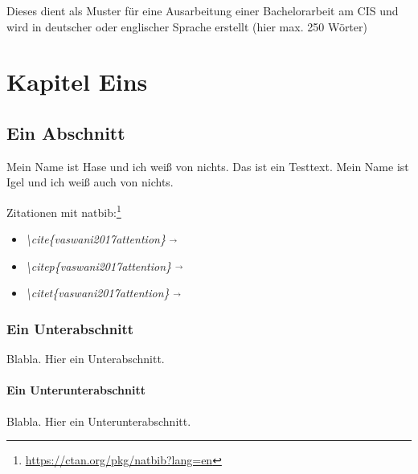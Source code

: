 \documentclass[11pt,a4paper,twoside,openright]{scrbook}
\begin{document}
\deckblatt

\pagestyle{scrheadings}

\erklaerung

\thispagestyle{scrplain}
\noindent
Dieses 
dient als Muster für eine Ausarbeitung einer
Bachelorarbeit am CIS und wird in deutscher oder englischer Sprache
erstellt (hier max. 250 Wörter)


\tableofcontents


\chapter{Kapitel Eins}

\section{Ein Abschnitt}
Mein Name ist Hase und ich weiß von nichts. Das ist ein Testtext. Mein Name ist
Igel und ich weiß auch von nichts. 

\vspace{1em}
\noindent Zitationen mit natbib:\footnote{\url{https://ctan.org/pkg/natbib?lang=en}} 

\begin{itemize}
    \item \textit{\textbackslash cite\{vaswani2017attention\}} $\overrightarrow{}$ \cite{vaswani2017attention}
    \item \textit{\textbackslash citep\{vaswani2017attention\}} $\overrightarrow{}$ \citep{vaswani2017attention}
    \item \textit{\textbackslash citet\{vaswani2017attention\}} $\overrightarrow{}$ \citet{vaswani2017attention}
\end{itemize}


\subsection{Ein Unterabschnitt}
Blabla. Hier ein Unterabschnitt.

\subsubsection{Ein Unterunterabschnitt}
\label{sec:a}
Blabla. Hier ein Unterunterabschnitt.
\end{document}
